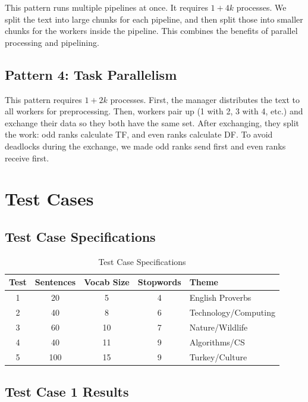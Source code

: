 \documentclass[12pt,a4paper]{article}
\begin{document}
This pattern runs multiple pipelines at once. It requires $1 + 4k$ processes. We split the text into large chunks for each pipeline, and then split those into smaller chunks for the workers inside the pipeline. This combines the benefits of parallel processing and pipelining.

\subsection{Pattern 4: Task Parallelism}

This pattern requires $1 + 2k$ processes. First, the manager distributes the text to all workers for preprocessing. Then, workers pair up (1 with 2, 3 with 4, etc.) and exchange their data so they both have the same set.
After exchanging, they split the work: odd ranks calculate TF, and even ranks calculate DF. To avoid deadlocks during the exchange, we made odd ranks send first and even ranks receive first.

\section{Test Cases}

\subsection{Test Case Specifications}

\begin{table}[h]
\centering
\begin{tabular}{|c|c|c|c|l|}
\hline
\textbf{Test} & \textbf{Sentences} & \textbf{Vocab Size} & \textbf{Stopwords} & \textbf{Theme} \\
\hline
1 & 20 & 5 & 4 & English Proverbs \\
2 & 40 & 8 & 6 & Technology/Computing \\
3 & 60 & 10 & 7 & Nature/Wildlife \\
4 & 40 & 11 & 9 & Algorithms/CS \\
5 & 100 & 15 & 9 & Turkey/Culture \\
\hline
\end{tabular}
\caption{Test Case Specifications}
\end{table}

\subsection{Test Case 1 Results}
\end{document}
